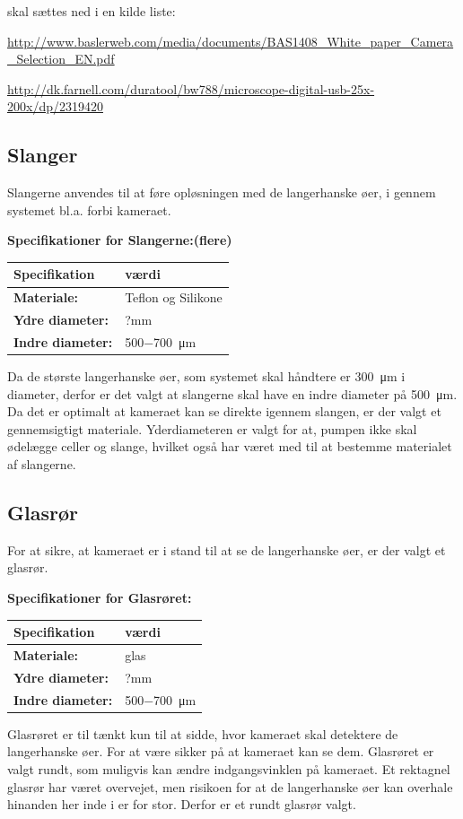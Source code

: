 skal sættes ned i en kilde liste:

\url{http://www.baslerweb.com/media/documents/BAS1408_White_paper_Camera_Selection_EN.pdf}

\url{http://dk.farnell.com/duratool/bw788/microscope-digital-usb-25x-200x/dp/2319420}
 
\subsection{Slanger}
Slangerne anvendes til at føre opløsningen med de langerhanske øer, i gennem systemet bl.a. forbi kameraet.

\textbf{Specifikationer for Slangerne:(flere)} 
\begin{center}
		\begin{longtable}{ | m{6.5cm} | m{6.5cm}| } 
			\hline
			\textbf{Specifikation} &\textbf{værdi} \\ 
			\hline
			\textbf{Materiale:} & Teflon og Silikone \\ 
			\hline
			\textbf{Ydre diameter:} & ?mm  \\ 
			\hline
			\textbf{Indre diameter:} & \SI{500-700}{\micro\metre}  \\ 
			\hline			
		\end{longtable}
\end{center}

Da de største langerhanske øer, som systemet skal håndtere er \SI{300}{\micro\metre} i diameter, derfor er det valgt at slangerne skal have en indre diameter på \SI{500}{\micro\metre}. Da det er optimalt at kameraet kan se direkte igennem slangen, er der valgt et gennemsigtigt materiale. Yderdiameteren er valgt for at, pumpen ikke skal ødelægge celler og slange, hvilket også har været med til at bestemme materialet af slangerne. 

\subsection{Glasrør}
For at sikre, at kameraet er i stand til at se de langerhanske øer, er der valgt et glasrør.

\textbf{Specifikationer for Glasrøret:} 
\begin{center}
		\begin{longtable}{ | m{6.5cm} | m{6.5cm}| } 
			\hline
			\textbf{Specifikation} &\textbf{værdi} \\ 
			\hline
			\textbf{Materiale:} & glas \\ 
			\hline
			\textbf{Ydre diameter:} & ?mm  \\ 
			\hline
			\textbf{Indre diameter:} & \SI{500-700}{\micro\metre}  \\ 
			\hline			
		\end{longtable}
\end{center}
Glasrøret er til tænkt kun til at sidde, hvor kameraet skal detektere de langerhanske øer. For at være sikker på at kameraet kan se dem. Glasrøret er valgt rundt, som muligvis kan ændre indgangsvinklen på kameraet. Et rektagnel glasrør har været overvejet, men risikoen for at de langerhanske øer kan overhale hinanden her inde i er for stor. Derfor er et rundt glasrør valgt.

